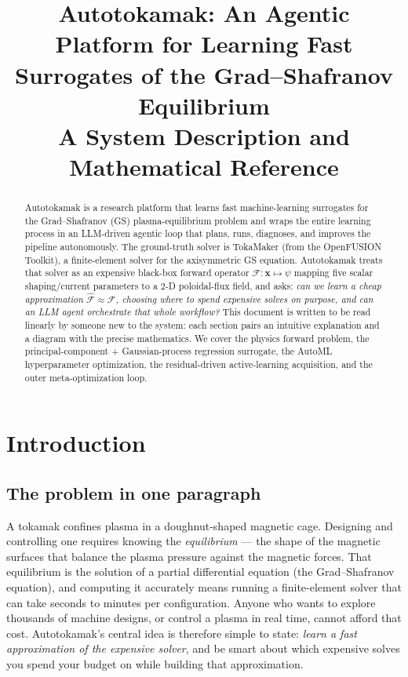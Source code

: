 \documentclass[11pt]{article}
\title{\textbf{Autotokamak: An Agentic Platform for Learning Fast
Surrogates of the Grad--Shafranov Equilibrium}\\[0.4em]
\large A System Description and Mathematical Reference}
\author{}
\date{}
\newcommand{\bx}{\mathbf{x}}
\newcommand{\Ffwd}{\mathcal{F}}
\newcommand{\Fhat}{\hat{\mathcal{F}}}
\begin{document}
\maketitle

\begin{abstract}
\noindent
Autotokamak is a research platform that learns fast machine-learning surrogates for the
Grad--Shafranov (GS) plasma-equilibrium problem and wraps the entire learning process in an
LLM-driven agentic loop that plans, runs, diagnoses, and improves the pipeline autonomously.
The ground-truth solver is TokaMaker (from the OpenFUSION Toolkit), a finite-element solver
for the axisymmetric GS equation. Autotokamak treats that solver as an expensive black-box
forward operator $\Ffwd:\bx\mapsto\psi$ mapping five scalar shaping/current
parameters to a 2-D poloidal-flux field, and asks: \emph{can we learn a cheap approximation
$\Fhat\approx\Ffwd$, choosing where to spend expensive solves on purpose, and can an LLM agent
orchestrate that whole workflow?} This document is written to be read linearly by someone new to
the system: each section pairs an intuitive explanation and a diagram with the precise
mathematics. We cover the physics forward problem, the principal-component + Gaussian-process
regression surrogate, the AutoML hyperparameter optimization, the residual-driven
active-learning acquisition, and the outer meta-optimization loop.
\end{abstract}

\tableofcontents
\vspace{1em}

\section{Introduction}

\subsection{The problem in one paragraph}
A tokamak confines plasma in a doughnut-shaped magnetic cage. Designing and controlling one
requires knowing the \emph{equilibrium} --- the shape of the magnetic surfaces that balance the
plasma pressure against the magnetic forces. That equilibrium is the solution of a partial
differential equation (the Grad--Shafranov equation), and computing it accurately means running a
finite-element solver that can take seconds to minutes per configuration. Anyone who wants to
explore thousands of machine designs, or control a plasma in real time, cannot afford that cost.
Autotokamak's central idea is therefore simple to state: \emph{learn a fast approximation of the
expensive solver}, and be smart about which expensive solves you spend your budget on while
building that approximation.
\end{document}
